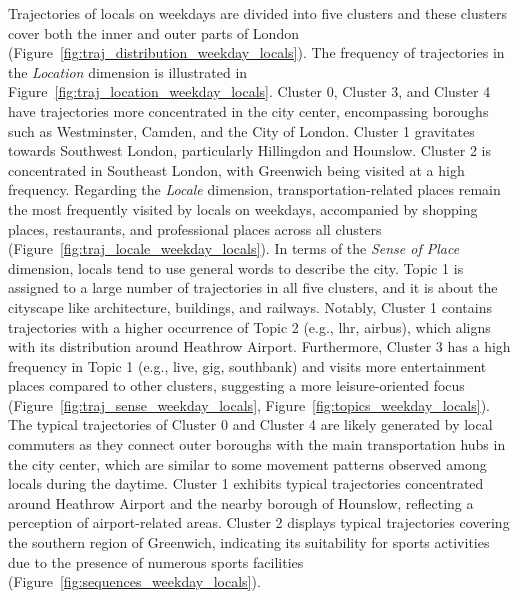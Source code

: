 \documentclass{article}
\theoremstyle{definition}
\theoremstyle{remark}
\begin{document}
Trajectories of locals on weekdays are divided into five clusters and these clusters cover both the inner and outer parts of London  (Figure~\ref{fig:traj_distribution_weekday_locals}). The frequency of trajectories in the \textit{Location} dimension is illustrated in Figure~\ref{fig:traj_location_weekday_locals}. Cluster 0, Cluster 3, and Cluster 4 have trajectories more concentrated in the city center, encompassing boroughs such as Westminster, Camden, and the City of London. Cluster 1 gravitates towards Southwest London, particularly Hillingdon and Hounslow. Cluster 2 is concentrated in Southeast London, with Greenwich being visited at a high frequency. Regarding the \textit{Locale} dimension, transportation-related places remain the most frequently visited by locals on weekdays, accompanied by shopping places, restaurants, and professional places across all clusters (Figure~\ref{fig:traj_locale_weekday_locals}). In terms of the \textit{Sense of Place} dimension, locals tend to use general words to describe the city. Topic 1 is assigned to a large number of trajectories in all five clusters, and it is about the cityscape like architecture, buildings, and railways. Notably, Cluster 1 contains trajectories with a higher occurrence of Topic 2 (e.g., lhr, airbus), which aligns with its distribution around Heathrow Airport. Furthermore, Cluster 3 has a high frequency in Topic 1 (e.g., live, gig, southbank) and visits more entertainment places compared to other clusters, suggesting a more leisure-oriented focus (Figure~\ref{fig:traj_sense_weekday_locals}, Figure~\ref{fig:topics_weekday_locals}). The typical trajectories of Cluster 0 and Cluster 4 are likely generated by local commuters as they connect outer boroughs with the main transportation hubs in the city center, which are similar to some movement patterns observed among locals during the daytime. Cluster 1 exhibits typical trajectories concentrated around Heathrow Airport and the nearby borough of Hounslow, reflecting a perception of airport-related areas. Cluster 2 displays typical trajectories covering the southern region of Greenwich, indicating its suitability for sports activities due to the presence of numerous sports facilities (Figure~\ref{fig:sequences_weekday_locals}).
\end{document}
